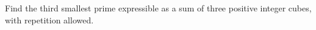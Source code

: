 Find the third smallest prime expressible as a sum of three positive integer cubes, with repetition allowed.
